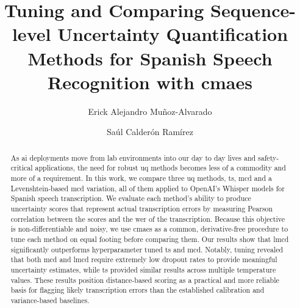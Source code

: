 \documentclass[runningheads]{llncs}
\begin{document}
%
\title{Tuning and Comparing Sequence-level Uncertainty Quantification Methods for Spanish Speech Recognition with \texorpdfstring{\acrshort{cmaes}}{CMA-ES}}
%
%
\author{Erick Alejandro Muñoz-Alvarado \and
    Saúl Calderón Ramírez}
%
%
%
\maketitle              %
%
\begin{abstract}
    As \acrshort{ai} deployments move from lab environments into our day to day lives and safety-critical applications, the need for robust \acrshort{uq} methods becomes less of a commodity and more of a requirement. In this work, we compare three \acrshort{uq} methods, \acrfull{ts}, \acrfull{mcd} and a Levenshtein-based \acrshort{mcd} variation, all of them applied to OpenAI's Whisper models for Spanish speech transcription. We evaluate each method's ability to produce uncertainty scores that represent actual transcription errors by measuring Pearson correlation between the scores and the \acrlong{wer} of the transcription. Because this objective is non-differentiable and noisy, we use \acrfull{cmaes} as a common, derivative-free procedure to tune each method on equal footing before comparing them. Our results show that \acrfull{lmcd} significantly outperforms hyperparameter tuned \acrshort{ts} and \acrshort{mcd}. Notably, tuning revealed that both \acrshort{mcd} and \acrshort{lmcd} require extremely low dropout rates to provide meaningful uncertainty estimates, while \acrshort{ts} provided similar results across multiple temperature values. These results position distance-based scoring as a practical and more reliable basis for flagging likely transcription errors than the established calibration and variance-based baselines.

\end{abstract}
%
%
%
\end{document}
